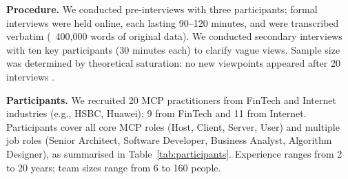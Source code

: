 \textbf{Procedure.} We conducted pre-interviews with three participants; formal interviews
were held online, each lasting 90--120 minutes, and were transcribed verbatim (~400,000 words
of original data). We conducted secondary interviews with ten key participants (30 minutes
each) to clarify vague views. Sample size was determined by theoretical saturation: no new
viewpoints appeared after 20 interviews \cite{ma2025practitioners}.

\textbf{Participants.} We recruited 20 MCP practitioners from FinTech and Internet industries
(e.g., HSBC, Huawei); 9 from FinTech and 11 from Internet. Participants cover all core MCP
roles (Host, Client, Server, User) and multiple job roles (Senior Architect, Software
Developer, Business Analyst, Algorithm Designer), as summarised in
Table~\ref{tab:participants}. Experience ranges from 2 to 20 years; team sizes range from 6
to 160 people.

